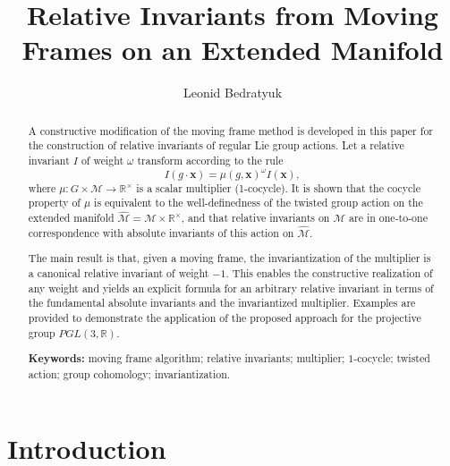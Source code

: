 \documentclass[12pt,reqno]{amsart}
\begin{document}
\noindent

\title { Relative Invariants from Moving Frames on an Extended Manifold} 


\author{Leonid Bedratyuk} 
\address{ Khmelnytsky National University, Ukraine}

\begin{abstract}


A constructive modification of the moving frame method is developed in this paper for the construction of relative invariants of regular Lie group actions. Let a relative invariant $I$ of weight $\omega$ transform according to the rule  
$$  
I(g \cdot \boldsymbol x) = \mu(g, \boldsymbol x)^{\omega} I(\boldsymbol x),  
$$  
where $\mu: G \times \mathcal{M} \to \mathbb{R}^\times$ is a scalar multiplier (1-cocycle). It is shown that the cocycle property of $\mu$ is equivalent to the well-definedness of the twisted group action on the extended manifold $\widehat{\mathcal{M}} = \mathcal{M} \times \mathbb{R}^\times$, and that relative invariants on $\mathcal{M}$ are in one-to-one correspondence with absolute invariants of this action on $\widehat{\mathcal{M}}$.

The main result is that, given a moving frame, the invariantization of the multiplier is a canonical relative invariant of weight $-1$. This enables the constructive realization of any weight and yields an explicit formula for an arbitrary relative invariant in terms of the fundamental absolute invariants and the invariantized multiplier. Examples are provided to demonstrate the application of the proposed approach for the projective group $PGL(3, \mathbb{R})$.

\noindent\textbf{Keywords:}  moving frame algorithm; relative invariants; multiplier; $1$-cocycle; twisted action; group cohomology; invariantization.

 

\end{abstract}




\maketitle 


\section{Introduction}
\end{document}
